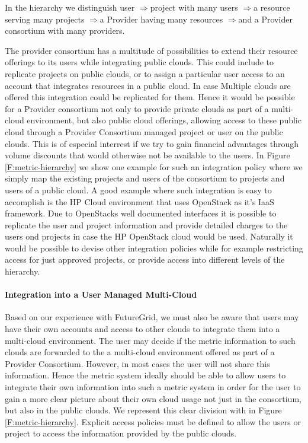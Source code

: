 \documentclass{tex/sig-alternate-2013}
\newcommand{\todo}[1]{{\color{red}{#1}}}
\begin{document}
{\newcommand{\ARROW}{$\Rightarrow$}

\todo{READ}

In the hierarchy we distinguish user \ARROW project with many users \ARROW a resource serving many projects \ARROW a Provider having many resources \ARROW and a Provider consortium with many providers.

The provider consortium has a multitude of possibilities to extend their resource offerings to its users while integrating public clouds. This could include to replicate projects on public clouds, or to assign a particular user access to an account that integrates resources in a public cloud. In case Multiple clouds are offered this integration could be replicated for them. Hence it would be possible for a Provider consortium not only to provide private clouds as part of a multi-cloud environment, but also public cloud offerings, allowing access to these public cloud through a Provider Consortium managed project or user on the public clouds. This is of especial interrest if we try to gain financial advantages through volume discounts that would otherwise not be available to the users.  In Figure \ref{F:metric-hierarchy} we show one example for such an integration policy where we simply map the existing projects and users of the consortium to projects and users of a public cloud. A good example where such integration is easy to accomplish is the HP Cloud environment that uses OpenStack as it's IaaS framework. Due to OpenStacks well documented interfaces it is possible to replicate the user and project information and provide detailed charges to the users ond projects in case the HP OpenStack cloud would be used. Naturally it would be possible to devise other integration policies while for example restricting access for just approved projects, or provide access into different levels of the hierarchy.

\paragraph{Integration into a User Managed Multi-Cloud}

\todo{READ}

Based on our experience with FutureGrid, we must also be aware that users may have their own accounts and access to other clouds to integrate them into a multi-cloud environment. The user may decide if the metric information to such clouds are forwarded to the a multi-cloud environment offered as part of a Provider Consortium. However, in most cases the user will not share this information. Hence the metric system ideally should be able to allow users to integrate their own information into such a metric system in order for the user to gain a more clear picture about their own cloud usage not just in the consortium, but also in the public clouds. We represent this clear division with in Figure \ref{F:metric-hierarchy}. Explicit access policies must be defined to allow the users or project to access the information provided by the public clouds.


}
\end{document}
